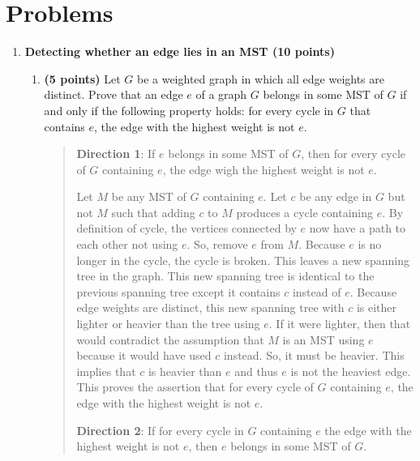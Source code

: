 \documentclass[11pt]{article}
\begin{document}
\section*{Problems}
\begin{enumerate}

\item {\bf Detecting whether an edge lies in an MST (10 points)}

\begin{enumerate}
    \item {\bf (5 points)} Let $G$ be a weighted graph in which all edge weights are distinct. Prove that an edge $e$ of a graph $G$ belongs in some MST of $G$ if and only if the following property holds: for every cycle in $G$ that contains $e$, the edge with the highest weight is not $e$.
    \begin{quote}
      \color{purple}
      \textbf{Direction 1}: If $e$ belongs in some MST of $G$, then for every cycle of $G$ containing $e$, the edge wigh the highest weight is not $e$. 

      \medskip
      Let $M$ be any MST of $G$ containing $e$. Let $c$ be any edge in $G$ but not $M$ such that adding $c$ to $M$ produces a cycle containing $e$. By definition of cycle, the vertices connected by $e$ now have a path to each other not using $e$. So, remove $e$ from $M$. Because $e$ is no longer in the cycle, the cycle is broken. This leaves a new spanning tree in the graph. This new spanning tree is identical to the previous spanning tree except it contains $c$ instead of $e$. Because edge weights are distinct, this new spanning tree with $c$ is either lighter or heavier than the tree using $e$. If it were lighter, then that would contradict the assumption that $M$ is an MST using $e$ because it would have used $c$ instead. So, it must be heavier. This implies that $c$ is heavier than $e$ and thus $e$ is not the heaviest edge. This proves the assertion that for every cycle of $G$ containing $e$, the edge with the highest weight is not $e$.

      \medskip
      \textbf{Direction 2}: If for every cycle in $G$ containing $e$ the edge with the highest weight is not $e$, then $e$ belongs in some MST of $G$. 


\end{quote}
\end{enumerate}
\end{enumerate}
\end{document}
